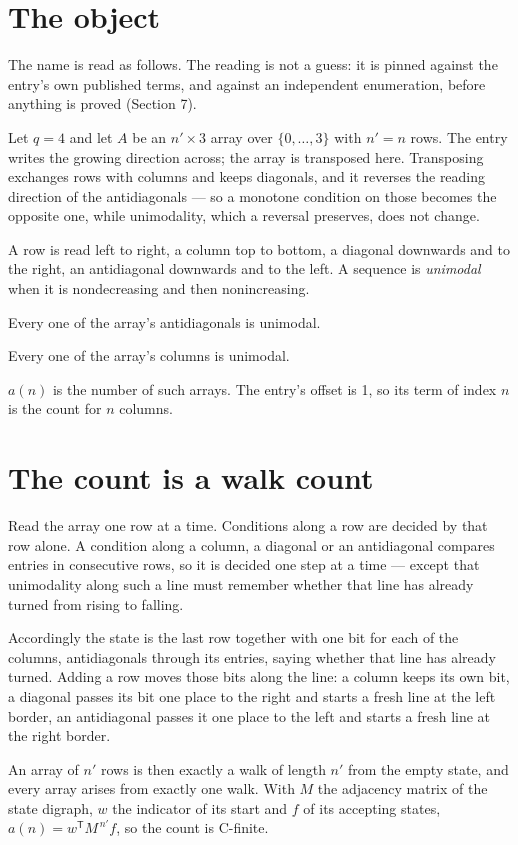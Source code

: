 \documentclass[11pt]{article}
\theoremstyle{definition}
\begin{document}
\section{The object}

The name is read as follows. The reading is not a guess: it is pinned against the entry's own published terms, and against an independent enumeration, before anything is proved (Section 7).

Let $q = 4$ and let $A$ be an $n' \times 3$ array over $\{0,\dots,3\}$ with $n' = n$ rows. The entry writes the growing direction across; the array is transposed here. Transposing exchanges rows with columns and keeps diagonals, and it reverses the reading direction of the antidiagonals --- so a monotone condition on those becomes the opposite one, while unimodality, which a reversal preserves, does not change.

A row is read left to right, a column top to bottom, a diagonal downwards and to the right, an antidiagonal downwards and to the left. A sequence is {\itshape unimodal} when it is nondecreasing and then nonincreasing.

Every one of the array's antidiagonals is unimodal.

Every one of the array's columns is unimodal.

$a(n)$ is the number of such arrays. The entry's offset is 1, so its term of index $n$ is the count for $n$ columns.

\section{The count is a walk count}

Read the array one row at a time. Conditions along a row are decided by that row alone. A condition along a column, a diagonal or an antidiagonal compares entries in consecutive rows, so it is decided one step at a time --- except that unimodality along such a line must remember whether that line has already turned from rising to falling.

Accordingly the state is the last row together with one bit for each of the columns, antidiagonals through its entries, saying whether that line has already turned. Adding a row moves those bits along the line: a column keeps its own bit, a diagonal passes its bit one place to the right and starts a fresh line at the left border, an antidiagonal passes it one place to the left and starts a fresh line at the right border.

An array of $n'$ rows is then exactly a walk of length $n'$ from the empty state, and every array arises from exactly one walk. With $M$ the adjacency matrix of the state digraph, $w$ the indicator of its start and $f$ of its accepting states, $a(n) = w^{\mathsf T}M^{\,n'}f$, so the count is C-finite.
\end{document}

